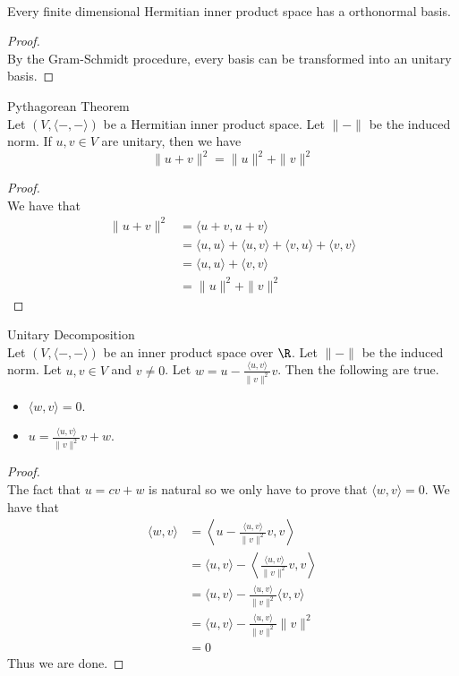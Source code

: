 \documentclass[a4paper]{article}
\begin{document}
\begin{crl}{}{}\\
Every finite dimensional Hermitian inner product space has a orthonormal basis. 
\begin{proof}\\
By the Gram-Schmidt procedure, every basis can be transformed into an unitary basis. 
\end{proof}
\end{crl}

\begin{thm}{Pythagorean Theorem}{}\\
Let $(V,\langle-,-\rangle)$ be a Hermitian inner product space. Let $\|-\|$ be the induced norm. If $u,v\in V$ are unitary, then we have $$\|u+v\|^2=\|u\|^2+\|v\|^2$$ 
\begin{proof}\\
We have that 
\begin{align*}
\|u+v\|^2&=\langle u+v,u+v\rangle\\
&=\langle u,u\rangle+\langle u,v\rangle+\langle v,u\rangle+\langle v,v\rangle\\
&=\langle u,u\rangle+\langle v,v\rangle\\
&=\|u\|^2+\|v\|^2
\end{align*}
\end{proof}
\end{thm}

\begin{thm}{Unitary Decomposition}{}\\
Let $(V,\langle-,-\rangle)$ be an inner product space over $\R$. Let $\|-\|$ be the induced norm. Let $u,v\in V$ and $v\neq 0$. Let $w=u-\frac{\langle u,v\rangle}{\|v\|^2}v$. Then the following are true. 
\begin{itemize}
\item $\langle w,v\rangle=0$. 
\item $u=\frac{\langle u,v\rangle}{\|v\|^2}v+w$. 
\end{itemize}
\begin{proof}\\
The fact that $u=cv+w$ is natural so we only have to prove that $\langle w,v\rangle=0$. We have that 
\begin{align*}
\langle w,v\rangle&=\left\langle u-\frac{\langle u,v\rangle}{\|v\|^2}v,v\right\rangle\\
&=\langle u,v\rangle-\left\langle \frac{\langle u,v\rangle}{\|v\|^2}v,v\right\rangle\\
&=\langle u,v\rangle-\frac{\langle u,v\rangle}{\|v\|^2}\langle v,v\rangle\\
&=\langle u,v\rangle-\frac{\langle u,v\rangle}{\|v\|^2}\|v\|^2\\
&=0
\end{align*}
Thus we are done. 
\end{proof}
\end{thm}
\end{document}
